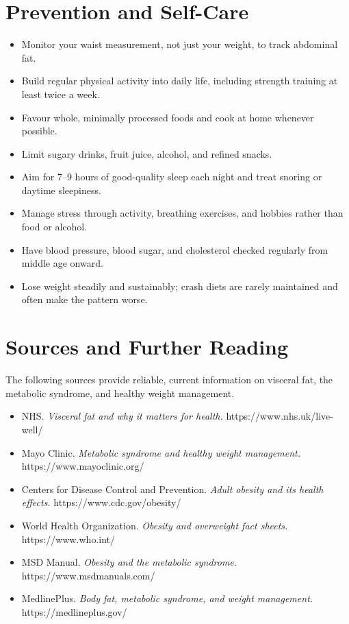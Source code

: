 \section*{Prevention and Self-Care}
\begin{itemize}
    \item Monitor your waist measurement, not just your weight, to track abdominal fat.
    \item Build regular physical activity into daily life, including strength training at least twice a week.
    \item Favour whole, minimally processed foods and cook at home whenever possible.
    \item Limit sugary drinks, fruit juice, alcohol, and refined snacks.
    \item Aim for 7--9 hours of good-quality sleep each night and treat snoring or daytime sleepiness.
    \item Manage stress through activity, breathing exercises, and hobbies rather than food or alcohol.
    \item Have blood pressure, blood sugar, and cholesterol checked regularly from middle age onward.
    \item Lose weight steadily and sustainably; crash diets are rarely maintained and often make the pattern worse.
\end{itemize}

\section*{Sources and Further Reading}
The following sources provide reliable, current information on visceral fat, the metabolic syndrome, and healthy weight management.
\begin{itemize}
    \item NHS. \textit{Visceral fat and why it matters for health.} https://www.nhs.uk/live-well/
    \item Mayo Clinic. \textit{Metabolic syndrome and healthy weight management.} https://www.mayoclinic.org/
    \item Centers for Disease Control and Prevention. \textit{Adult obesity and its health effects.} https://www.cdc.gov/obesity/
    \item World Health Organization. \textit{Obesity and overweight fact sheets.} https://www.who.int/
    \item MSD Manual. \textit{Obesity and the metabolic syndrome.} https://www.msdmanuals.com/
    \item MedlinePlus. \textit{Body fat, metabolic syndrome, and weight management.} https://medlineplus.gov/
\end{itemize}
